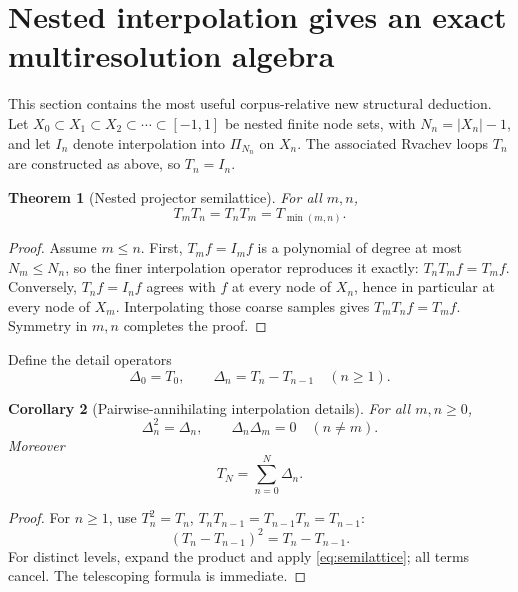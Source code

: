 \documentclass[11pt,oneside]{article}
\numberwithin{equation}{section}
\newtheorem{theorem}{Theorem}[section]
\newtheorem{corollary}[theorem]{Corollary}
\theoremstyle{definition}
\theoremstyle{remark}
\begin{document}
\section{Nested interpolation gives an exact multiresolution algebra}
\label{sec:nested}

This section contains the most useful corpus-relative new structural deduction.
Let \(X_0\subset X_1\subset X_2\subset\cdots\subset[-1,1]\) be nested finite
node sets, with \(N_n=|X_n|-1\), and let \(I_n\) denote interpolation into
\(\Pi_{N_n}\) on \(X_n\).  The associated Rvachev loops \(T_n\) are constructed
as above, so \(T_n=I_n\).

\begin{theorem}[Nested projector semilattice]
\label{thm:nested-semilt}
For all \(m,n\),
\begin{equation}
 \boxed{T_mT_n=T_nT_m=T_{\min(m,n)}.}
 \label{eq:semilattice}
\end{equation}
\end{theorem}

\begin{proof}
Assume \(m\le n\).  First, \(T_mf=I_mf\) is a polynomial of degree at most
\(N_m\le N_n\), so the finer interpolation operator reproduces it exactly:
\(T_nT_mf=T_mf\).  Conversely, \(T_nf=I_nf\) agrees with \(f\) at every node of
\(X_n\), hence in particular at every node of \(X_m\).  Interpolating those coarse
samples gives \(T_mT_nf=T_mf\).  Symmetry in \(m,n\) completes the proof.
\end{proof}

Define the detail operators
\begin{equation}
 \Delta_0=T_0,
 \qquad
 \Delta_n=T_n-T_{n-1}\quad(n\ge1).
 \label{eq:details}
\end{equation}

\begin{corollary}[Pairwise-annihilating interpolation details]
\label{cor:details}
For all \(m,n\ge0\),
\begin{equation}
 \boxed{
 \Delta_n^2=\Delta_n,
 \qquad
 \Delta_n\Delta_m=0\quad(n\ne m).}
 \label{eq:details-algebra}
\end{equation}
Moreover
\begin{equation}
 T_N=\sum_{n=0}^{N}\Delta_n.
 \label{eq:detail-telescope}
\end{equation}
\end{corollary}

\begin{proof}
For \(n\ge1\), use \(T_n^2=T_n\),
\(T_nT_{n-1}=T_{n-1}T_n=T_{n-1}\):
\[
 (T_n-T_{n-1})^2=T_n-T_{n-1}.
\]
For distinct levels, expand the product and apply
\eqref{eq:semilattice}; all terms cancel.  The telescoping formula is immediate.
\end{proof}
\end{document}
